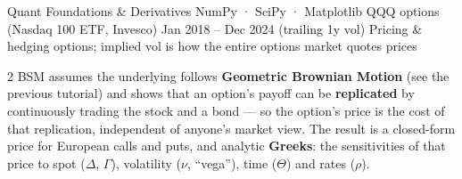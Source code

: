 \documentclass{pyportfolios-note}
\begin{document}
\thispagestyle{notecover}





\notecard
  {Quant Foundations \& Derivatives}
  {NumPy · SciPy · Matplotlib}
  {QQQ options (Nasdaq 100 ETF, Invesco)}
  {Jan 2018 – Dec 2024 (trailing 1y vol)}
  {Pricing \& hedging options; implied vol is how the entire options market
   quotes prices}

\noteneedroom{150bp}

\begin{multicols}{2}
BSM assumes the underlying follows \textbf{Geometric Brownian Motion} (see the
previous tutorial) and shows that an option's payoff can be \textbf{replicated}
by continuously trading the stock and a bond — so the option's price is the cost
of that replication, independent of anyone's market view. The result is a
closed-form price for European calls and puts, and analytic \textbf{Greeks}: the
sensitivities of that price to spot ($\Delta$, $\Gamma$), volatility ($\nu$,
``vega''), time ($\Theta$) and rates ($\rho$).
\end{multicols}

\noteneedroom{170bp}
\end{document}
